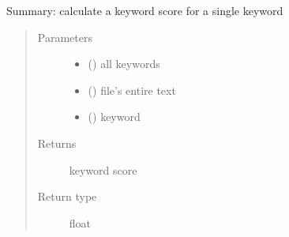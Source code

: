\documentclass[letterpaper,10pt,english]{sphinxmanual}
\begin{document}

\begin{fulllineitems}
\label{\detokenize{functionsv1:analyze_functions.calculatekeywordscore}}
Summary: calculate a keyword score for a single keyword
\begin{quote}\begin{description}
\item[{Parameters}] \leavevmode\begin{itemize}
\item {} 
 () \textendash{} all keywords

\item {} 
 () \textendash{} file’s entire text

\item {} 
 ({\hyperref[\detokenize{Keyword:module-Keyword}]{}}) \textendash{} keyword

\end{itemize}

\item[{Returns}] \leavevmode
keyword score

\item[{Return type}] \leavevmode
float

\end{description}\end{quote}

\end{fulllineitems}

\end{document}
